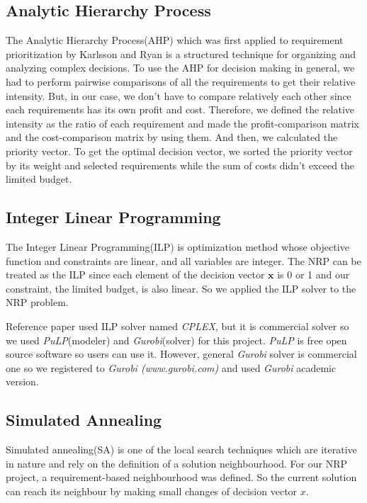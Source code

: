 \subsection{Analytic Hierarchy Process}
The Analytic Hierarchy Process(AHP) which was first applied to requirement prioritization by Karlsson and Ryan\cite{AHP} is a structured technique for organizing and analyzing complex decisions. To use the AHP for decision making in general, we had to perform pairwise comparisons of all the requirements to get their relative intensity. But, in our case, we don't have to compare relatively each other since each requirements has its own profit and cost. Therefore, we defined the relative intensity as the ratio of each requirement and made the profit-comparison matrix and the cost-comparison matrix by using them. And then, we calculated the priority vector. To get the optimal decision vector, we sorted the priority vector by its weight and selected requirements while the sum of costs didn't exceed the limited budget.


\subsection{Integer Linear Programming}
The Integer Linear Programming(ILP) is optimization method whose objective function and constraints are linear, and all variables are integer. The NRP can be treated as the ILP since each element of the decision vector $\textbf{x}$ is 0 or 1 and our constraint, the limited budget, is also linear. So we applied the ILP solver to the NRP problem.

Reference paper\cite{ILP} used ILP solver named \textit{CPLEX}, but it is commercial solver so we used \textit{PuLP}(modeler) and \textit{Gurobi}(solver) for this project. \textit{PuLP} is free open source software so users can use it. However, general \textit{Gurobi} solver is commercial one so we registered to \textit{Gurobi (www.gurobi.com)} and used \textit{Gurobi} academic version.

\subsection{Simulated Annealing}
Simulated annealing(SA) is one of the local search techniques which are iterative in nature and rely on the definition of a solution neighbourhood. For our NRP project, a requirement-based neighbourhood was defined. So the current solution can reach its neighbour by making small changes of decision vector $x$.

